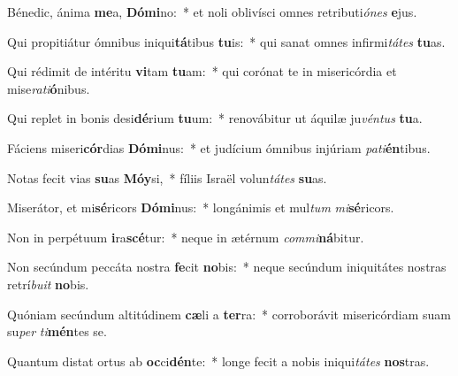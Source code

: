 \item Bénedic, ánima \textbf{me}a, \textbf{Dó}\textbf{mi}no:~* et noli oblivísci omnes retributi\textit{ó}\textit{nes} \textbf{e}jus.
\item Qui propitiátur ómnibus iniqui\textbf{tá}tibus \textbf{tu}is:~* qui sanat omnes infirmi\textit{tá}\textit{tes} \textbf{tu}as.
\item Qui rédimit de intéritu \textbf{vi}tam \textbf{tu}am:~* qui corónat te in misericórdia et mise\textit{ra}\textit{ti}\textbf{ó}nibus.
\item Qui replet in bonis desi\textbf{dé}rium \textbf{tu}um:~* renovábitur ut áquilæ ju\textit{vén}\textit{tus} \textbf{tu}a.
\item Fáciens miseri\textbf{cór}dias \textbf{Dó}\textbf{mi}nus:~* et judícium ómnibus injúriam \textit{pa}\textit{ti}\textbf{én}tibus.
\item Notas fecit vias \textbf{su}as \textbf{Mó}\textbf{y}si,~* fíliis Israël volun\textit{tá}\textit{tes} \textbf{su}as.
\item Miserátor, et mi\textbf{sé}ricors \textbf{Dó}\textbf{mi}nus:~* longánimis et mul\textit{tum} \textit{mi}\textbf{sé}ricors.
\item Non in perpétuum \textbf{i}ra\textbf{scé}tur:~* neque in ætérnum \textit{com}\textit{mi}\textbf{ná}bitur.
\item Non secúndum peccáta nostra \textbf{fe}cit \textbf{no}bis:~* neque secúndum iniquitátes nostras retrí\textit{bu}\textit{it} \textbf{no}bis.
\item Quóniam secúndum altitúdinem \textbf{cæ}li a \textbf{ter}ra:~* corroborávit misericórdiam suam su\textit{per} \textit{ti}\textbf{mén}tes se.
\item Quantum distat ortus ab \textbf{oc}ci\textbf{dén}te:~* longe fecit a nobis iniqui\textit{tá}\textit{tes} \textbf{nos}tras.
